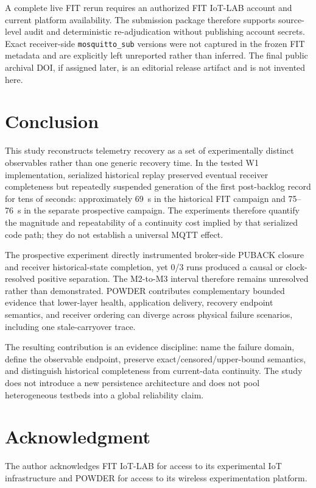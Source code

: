 \documentclass[journal]{IEEEtran}
\begin{document}
A complete live FIT rerun requires an authorized FIT IoT-LAB account and current platform availability. The submission package therefore supports source-level audit and deterministic re-adjudication without publishing account secrets. Exact receiver-side \texttt{mosquitto\_sub} versions were not captured in the frozen FIT metadata and are explicitly left unreported rather than inferred. The final public archival DOI, if assigned later, is an editorial release artifact and is not invented here.

\section{Conclusion}
\label{sec:conclusion}

This study reconstructs telemetry recovery as a set of experimentally distinct observables rather than one generic recovery time. In the tested W1 implementation, serialized historical replay preserved eventual receiver completeness but repeatedly suspended generation of the first post-backlog record for tens of seconds: approximately 69~s in the historical FIT campaign and 75--76~s in the separate prospective campaign. The experiments therefore quantify the magnitude and repeatability of a continuity cost implied by that serialized code path; they do not establish a universal MQTT effect.

The prospective experiment directly instrumented broker-side PUBACK closure and receiver historical-state completion, yet 0/3 runs produced a causal or clock-resolved positive separation. The M2-to-M3 interval therefore remains unresolved rather than demonstrated. POWDER contributes complementary bounded evidence that lower-layer health, application delivery, recovery endpoint semantics, and receiver ordering can diverge across physical failure scenarios, including one stale-carryover trace.

The resulting contribution is an evidence discipline: name the failure domain, define the observable endpoint, preserve exact/censored/upper-bound semantics, and distinguish historical completeness from current-data continuity. The study does not introduce a new persistence architecture and does not pool heterogeneous testbeds into a global reliability claim.

\section*{Acknowledgment}
The author acknowledges FIT IoT-LAB for access to its experimental IoT infrastructure and POWDER for access to its wireless experimentation platform.
\end{document}
